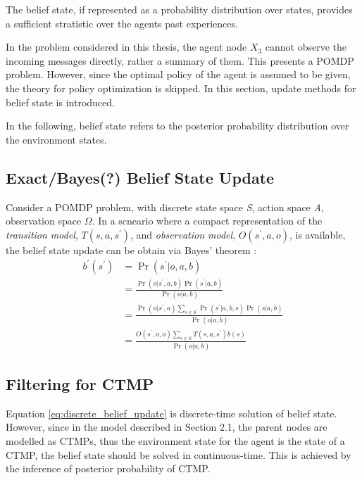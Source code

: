 The belief state, if represented as a probability distribution over states, provides a sufficient stratistic over the agents past experiences. 

In the problem considered in this thesis, the agent node $ X_{3} $ cannot observe the incoming messages directly, rather a summary of them. This presents a POMDP problem. However, since the optimal policy of the agent is assumed to be given, the theory for policy optimization is skipped. In this section, update methods for belief state is introduced.

In the following, belief state refers to the posterior probability distribution over the environment states.

\subsection{Exact/Bayes(?) Belief State Update}
\label{sec:exact_update}
Consider a POMDP problem, with discrete state space \textit{S}, action space \textit{A}, observation space $ \Omega $. In a scneario where a compact representation of the \textit{transition model}, $ T(s, a, s^{\prime})$,  and \textit{observation model}, $ O(s^{\prime}, a, o) $, is available, the belief state update can be obtain via Bayes' theorem \cite{KAELBLING199899}:
\begin{align}
b^{\prime}\left(s^{\prime}\right) &=\operatorname{Pr}\left(s^{\prime} | o, a, b\right) \nonumber\\
&=\frac{\operatorname{Pr}\left(o | s^{\prime}, a, b\right) \operatorname{Pr}\left(s^{\prime} | a, b\right)}{\operatorname{Pr}(o | a, b)} \nonumber\\
&=\frac{\operatorname{Pr}\left(o | s^{\prime}, a\right) \sum_{s \in \mathcal{S}} \operatorname{Pr}\left(s^{\prime} | a, b, s\right) \operatorname{Pr}(s | a, b)}{\operatorname{Pr}(o | a, b)} \nonumber\\
&=\frac{O\left(s^{\prime}, a, o\right) \sum_{s \in \mathcal{S}} T\left(s,a, s^{\prime}\right) b(s)}{\operatorname{Pr}(o | a, b)}
\label{eq:discrete_belief_update}
\end{align}

\subsection{Filtering for CTMP}
\label{sec:filtering_CTMC}
Equation \ref{eq:discrete_belief_update} is discrete-time solution of belief state. However, since in the model described in Section 2.1, the parent nodes are modelled as CTMPs, thus the environment state for the agent is the state of a CTMP, the belief state should be solved in continuous-time. This is achieved by the inference of posterior probability of CTMP. \cite{article}

